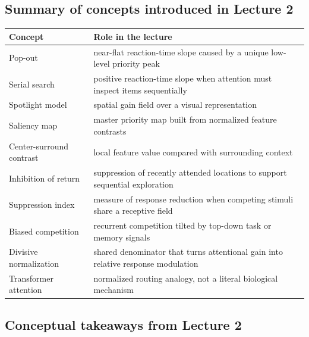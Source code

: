 \subsection{Summary of concepts introduced in Lecture 2}

\begin{center}
\begin{tabular}{lp{}}
\hline
Concept & Role in the lecture \\
\hline
Pop-out & near-flat reaction-time slope caused by a unique low-level priority peak \\
Serial search & positive reaction-time slope when attention must inspect items sequentially \\
Spotlight model & spatial gain field over a visual representation \\
Saliency map & master priority map built from normalized feature contrasts \\
Center-surround contrast & local feature value compared with surrounding context \\
Inhibition of return & suppression of recently attended locations to support sequential exploration \\
Suppression index & measure of response reduction when competing stimuli share a receptive field \\
Biased competition & recurrent competition tilted by top-down task or memory signals \\
Divisive normalization & shared denominator that turns attentional gain into relative response modulation \\
Transformer attention & normalized routing analogy, not a literal biological mechanism \\
\hline
\end{tabular}
\end{center}

\subsection{Conceptual takeaways from Lecture 2}

